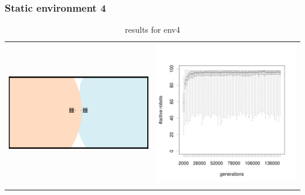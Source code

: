 \documentclass[a4paper,10pt]{article}
\begin{document}
\subsubsection{Static environment 4}

\begin{table}[h!]
\caption{results for env4}
\centering
\begin{tabular}{cc}
\includegraphics[width=\imgSize]{images/5StaticEnv/environments/staticEnv4}&\includegraphics[width=\imgSize]{images/5StaticEnv/alive_staticEnv4}\\
\newline

\end{tabular}
\end{table}
\end{document}
